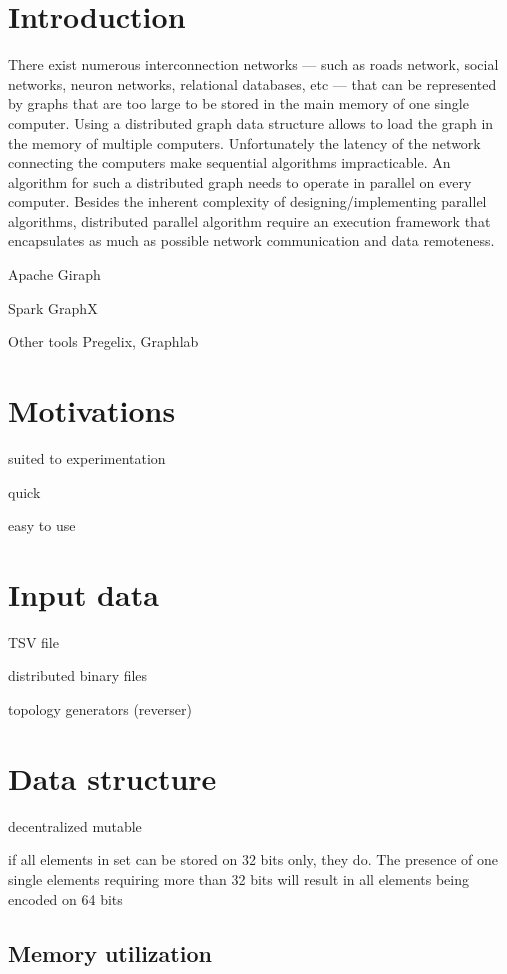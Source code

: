\documentclass[11pt,a4paper]{article}
\author{Nicolas Chleq, Luc Hogie, Michel Syska}
\begin{document}
\section{Introduction}

There exist numerous interconnection networks --- such as roads network, social networks, neuron networks, relational databases, etc --- that can be represented by graphs  that are too large to be stored in the main memory of one single computer. Using a distributed graph data structure allows to load the graph in the memory of multiple computers. Unfortunately the latency of the network connecting the computers make sequential algorithms impracticable. An algorithm for such a distributed graph needs to operate in parallel on every computer. Besides the inherent complexity of designing/implementing parallel algorithms, distributed parallel algorithm require an execution framework that encapsulates as much as possible network communication and data remoteness. 

Apache Giraph

Spark GraphX

Other tools Pregelix, Graphlab

\section{Motivations}

suited to experimentation

quick

easy to use


\section{Input data}

TSV file

distributed binary files

topology generators (reverser)

\section{Data structure}
	decentralized
	mutable
	
	if all elements in set can be stored on 32 bits only, they do. The presence of one single elements requiring more than 32 bits will result in all elements being encoded on 64 bits
	
\subsection{Memory utilization}
\end{document}
